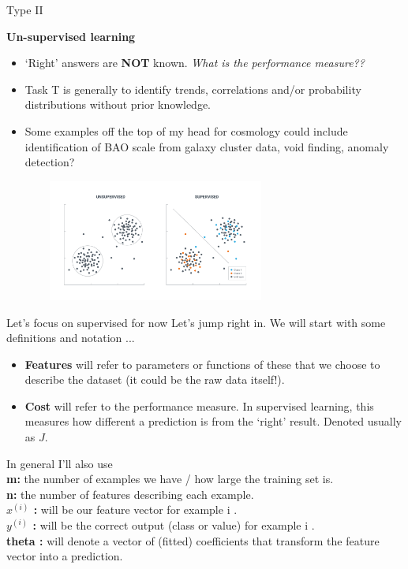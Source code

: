 \documentclass[usenames,dvipsnames]{beamer}
\begin{document}
\begin{frame}{Type II } 

{\bf \color{orange} Un-supervised learning} 
\begin{itemize}
\item
`Right' answers are {\bf NOT} known. \emph{What is the performance measure??} \pause
\item 
Task {\color{red} T} is generally to identify trends, correlations and/or probability distributions without prior knowledge. \pause
\item 
Some examples off the top of my head  for cosmology could include identification of BAO scale from galaxy cluster data, void finding, anomaly detection? \pause
\end{itemize}
\centering
    \includegraphics[width=10cm,height=4cm]{figs/unsupvssup.png}
\end{frame}


\begin{frame}{Let's focus on supervised for now} 
Let's jump right in. We will start with some definitions and notation ... \\  \pause
\begin{itemize}
\item
{\bf Features} will refer to parameters or functions of these that we choose to describe the dataset (it could be the raw data itself!).\pause
\item
{\bf Cost} will refer to the performance measure. In supervised learning, this measures how different  a prediction is from the `right' result. Denoted usually as $J$. \pause
\end{itemize}
In general I'll also use \\ 

{\bf \color{red} m: }  the number of examples we have / how large the training set is.  \\ \pause
{\bf \color{red} n: }  the number of features describing each example. \\ \pause
{\bf \color{red} $x^{(i)}$ : }  will be our feature vector for example i . \\ \pause
{\bf \color{red} $y^{(i)}$ : }  will be the correct output (class or value) for example i . \\ \pause
{\bf \color{red} theta : } will denote a vector of (fitted) coefficients that transform the feature vector into a prediction.   
\end{frame}
\end{document}
